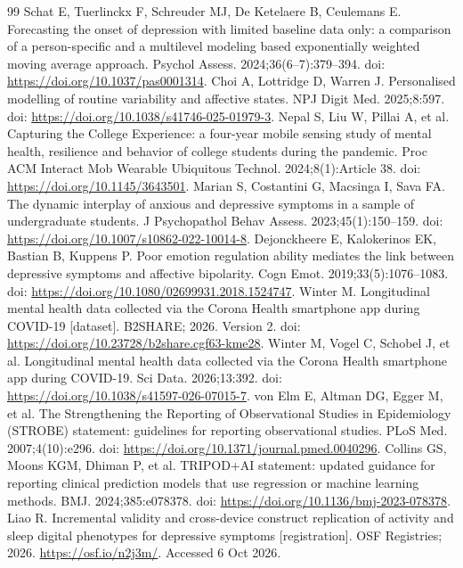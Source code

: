 \documentclass[pdflatex,sn-vancouver-num]{sn-jnl}
\begin{document}
\begin{thebibliography}{99}
 Schat E, Tuerlinckx F, Schreuder MJ, De Ketelaere B, Ceulemans E. Forecasting the onset of depression with limited baseline data only: a comparison of a person-specific and a multilevel modeling based exponentially weighted moving average approach. Psychol Assess. 2024;36(6--7):379--394. doi: \url{https://doi.org/10.1037/pas0001314}.
 Choi A, Lottridge D, Warren J. Personalised modelling of routine variability and affective states. NPJ Digit Med. 2025;8:597. doi: \url{https://doi.org/10.1038/s41746-025-01979-3}.
 Nepal S, Liu W, Pillai A, et al. Capturing the College Experience: a four-year mobile sensing study of mental health, resilience and behavior of college students during the pandemic. Proc ACM Interact Mob Wearable Ubiquitous Technol. 2024;8(1):Article 38. doi: \url{https://doi.org/10.1145/3643501}.
 Marian S, Costantini G, Macsinga I, Sava FA. The dynamic interplay of anxious and depressive symptoms in a sample of undergraduate students. J Psychopathol Behav Assess. 2023;45(1):150--159. doi: \url{https://doi.org/10.1007/s10862-022-10014-8}.
 Dejonckheere E, Kalokerinos EK, Bastian B, Kuppens P. Poor emotion regulation ability mediates the link between depressive symptoms and affective bipolarity. Cogn Emot. 2019;33(5):1076--1083. doi: \url{https://doi.org/10.1080/02699931.2018.1524747}.
 Winter M. Longitudinal mental health data collected via the Corona Health smartphone app during COVID-19 [dataset]. B2SHARE; 2026. Version 2. doi: \url{https://doi.org/10.23728/b2share.cgf63-kme28}.
 Winter M, Vogel C, Schobel J, et al. Longitudinal mental health data collected via the Corona Health smartphone app during COVID-19. Sci Data. 2026;13:392. doi: \url{https://doi.org/10.1038/s41597-026-07015-7}.
 von Elm E, Altman DG, Egger M, et al. The Strengthening the Reporting of Observational Studies in Epidemiology (STROBE) statement: guidelines for reporting observational studies. PLoS Med. 2007;4(10):e296. doi: \url{https://doi.org/10.1371/journal.pmed.0040296}.
 Collins GS, Moons KGM, Dhiman P, et al. TRIPOD+AI statement: updated guidance for reporting clinical prediction models that use regression or machine learning methods. BMJ. 2024;385:e078378. doi: \url{https://doi.org/10.1136/bmj-2023-078378}.
 Liao R. Incremental validity and cross-device construct replication of activity and sleep digital phenotypes for depressive symptoms [registration]. OSF Registries; 2026. \url{https://osf.io/n2j3m/}. Accessed 6 Oct 2026.

\end{thebibliography}
\end{document}
